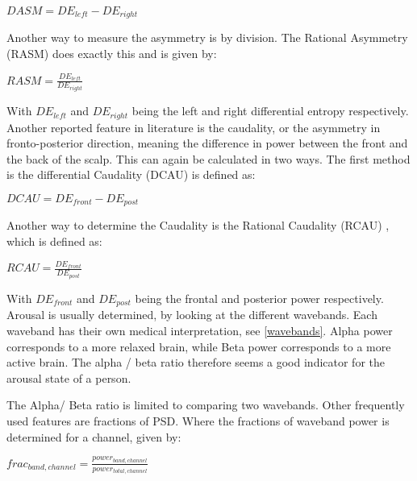 \begin{center}
$DASM = DE_{left} - DE_{right}$
\end{center}

Another way to measure the asymmetry is by division. The Rational Asymmetry (RASM)  does exactly this and is given by: \\

\begin{center}
$RASM = \frac{DE_{left}}{DE_{right}}$
\end{center}

With $DE_{left}$ and $DE_{right}$ being the left and right differential entropy respectively. Another reported feature in literature is the caudality, or the asymmetry in fronto-posterior direction\cite{caudality}, meaning the difference in power between the front and the back of the scalp. This can again be calculated in two ways. The first method is the differential Caudality (DCAU)  is defined as: \\

\begin{center}
$DCAU = DE_{front} - DE_{post}$
\end{center}

Another way to determine the Caudality is the Rational Caudality (RCAU) , which is defined as:

\begin{center}
$RCAU = \frac{DE_{front}}{DE_{post}}$
\end{center}

With $DE_{front}$ and $DE_{post}$ being the frontal and posterior power respectively. Arousal is usually determined, by looking at the different wavebands\citep{ExtendedPaper}. Each waveband has their own medical interpretation, see \ref{wavebands}. Alpha power corresponds to a more relaxed brain, while Beta power corresponds to a more active brain. The alpha / beta ratio therefore seems a good indicator for the arousal state of a person.

\npar

The Alpha/ Beta ratio is limited to comparing two wavebands. Other frequently used features are fractions of PSD. Where the fractions of waveband power is determined for a channel, given by:

\begin{center}
$frac_{band,channel} = \frac{power_{band,channel}}{power_{total,channel}}$
\end{center}

